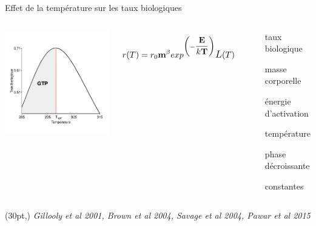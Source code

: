 \documentclass[11pt, compress, aspectratio=1610]{beamer}
\newcommand\smallcitation[1]{%
\begin{textblock*}{\textwidth}(30pt,\textheight)
    \raggedleft \small\textit{#1}
\end{textblock*}}
\providecommand{\tightlist}{%
  \setlength{\itemsep}{0pt}\setlength{\parskip}{0pt}}
\newcommand{\begincols}{\begin{columns}}
\newcommand{\stopcols}{\end{columns}}
\begin{document}
\begin{frame}{Effet de la température sur les taux biologiques}

\begincols
{}

\centering
\includegraphics[width=1\linewidth]{figuresAz/MTE.pdf}

\hfill{}

\[
    r(T)= r_0 \textbf{m}^{\beta} exp^{\biggl(-\dfrac{\textbf{E}}{k\textbf{T}}\biggr)}\mathlarger{L}(T)
\]

~

\begin{description}
\tightlist
\item[\(r(T)\)]
taux biologique
\item[\(m\)]
masse corporelle
\item[\(E\)]
énergie d'activation
\item[\(T\)]
température
\item[\(L(T)\)]
phase décroissante
\item[\(\beta\), \(r_0\), \(k\)]
constantes
\end{description}

\stopcols
\smallcitation{Gillooly et al 2001, Brown et al 2004, Savage et al 2004, Pawar et al 2015}

\end{frame}
\end{document}
